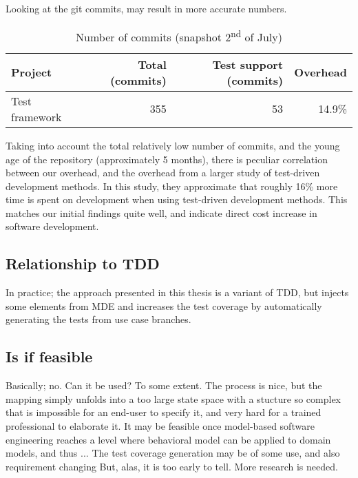 Looking at the git commits, may result in more accurate numbers.

\begin{table}[!htbp]
\begin{tabular}{ | l | r | r | r |}
   \hline
   Project        & Total (commits) & Test support (commits) & Overhead \\ \hline
   Test framework & 355             & 53                     & 14.9\%     \\
   \hline
\end{tabular}
\caption{Number of commits (snapshot 2\textsuperscript{nd} of July)}
\label{tab:metrics-commit-count}
\end{table}
Taking into account the total relatively low number of commits, and the young age of the repository (approximately 5 months), there is peculiar correlation between our overhead, and the overhead from a larger study of test-driven development methods\cite{george2003}. In this study, they approximate that roughly 16\% more time is spent on development when using test-driven development methods. This matches our initial findings quite well, and indicate direct cost increase in software development.
   


\subsection{Relationship to TDD}
In practice; the approach presented in this thesis is a variant of TDD, but injects some elements from MDE and increases the test coverage by automatically generating the tests from use case branches.



\subsection{Is if feasible}
Basically; no. Can it be used? To some extent. The process is nice, but the mapping simply unfolds into a too large state space with a stucture so complex that is impossible for an end-user to specify it, and very hard for a trained professional to elaborate it. It may be feasible once model-based software engineering reaches a level where behavioral model can be applied to domain models, and thus ...
The test coverage generation may be of some use, and also requirement changing
But, alas, it is too early to tell. More research is needed.


